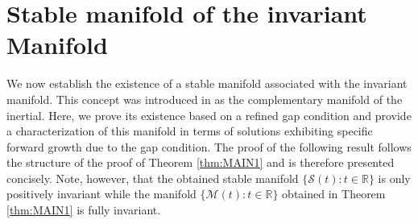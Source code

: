 \documentclass[a4paper,11pt,reqno]{amsart}
\theoremstyle{plain}
\theoremstyle{definition}
\numberwithin{equation}{section}
\newcommand{\R}{\mathbb{R}}
\newcommand{\calm}{\mathcal M}
\begin{document}
\section{Stable manifold of the invariant Manifold}\label{sec:stable}

\par We now establish the existence of a stable manifold associated with the invariant manifold. This concept was introduced in \cite{CLMO-S25} as the complementary manifold of the inertial. Here, we prove its existence based on a refined gap condition and provide a characterization of this manifold in terms of solutions exhibiting specific forward growth due to the gap condition. The proof of the following result follows the structure of the proof of Theorem \ref{thm:MAIN1} and is therefore presented concisely. Note, however, that the obtained stable manifold $\{\mathcal{S}(t)\colon t\in \R\}$ is only positively invariant while the manifold $\{\calm(t)\colon t\in \R\}$ obtained in Theorem \ref{thm:MAIN1} is fully invariant.    
\end{document}

